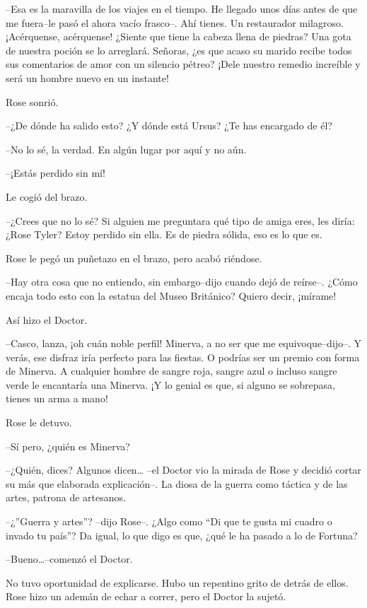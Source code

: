 --Esa es la maravilla de los viajes en el tiempo. He llegado unos días
antes de que me fuera--le pasó el ahora vacío frasco--. Ahí tienes. Un
restaurador milagroso. ¡Acérquense, acérquense! ¿Siente que tiene la
cabeza llena de piedras? Una gota de nuestra poción se lo arreglará.
Señoras, ¿es que acaso su marido recibe todos sus comentarios de amor
con un silencio pétreo? ¡Dele nuestro remedio increíble y será un hombre
nuevo en un instante!

Rose sonrió.

--¿De dónde ha salido esto? ¿Y dónde está Ursus? ¿Te has encargado de
él?

--No lo sé, la verdad. En algún lugar por aquí y no aún.

--¡Estás perdido sin mí!

Le cogió del brazo.

--¿Crees que no lo sé? Si alguien me preguntara qué tipo de amiga eres,
les diría: ¿Rose Tyler? Estoy perdido sin ella. Es de piedra sólida, eso
es lo que es.

Rose le pegó un puñetazo en el brazo, pero acabó riéndose.

--Hay otra cosa que no entiendo, sin embargo--dijo cuando dejó de
reírse--. ¿Cómo encaja todo esto con la estatua del Museo Británico?
Quiero decir, ¡mírame!

Así hizo el Doctor.

--Casco, lanza, ¡oh cuán noble perfil! Minerva, a no ser que me
equivoque--dijo--. Y verás, ese disfraz iría perfecto para las fiestas.
O podrías ser un premio con forma de Minerva. A cualquier hombre de
sangre roja, sangre azul o incluso sangre verde le encantaría una
Minerva. ¡Y lo genial es que, si alguno se sobrepasa, tienes un arma a
mano!

Rose le detuvo.

--Sí pero, ¿quién es Minerva?

--¿Quién, dices? Algunos dicen\ldots{} --el Doctor vio la mirada de Rose
y decidió cortar su más que elaborada explicación--. La diosa de la
guerra como táctica y de las artes, patrona de artesanos.

--¿''Guerra y artes''? --dijo Rose--. ¿Algo como ``Di que te gusta mi
cuadro o invado tu país''? Da igual, lo que digo es que, ¿qué le ha
pasado a lo de Fortuna?

--Bueno\ldots{}--comenzó el Doctor.

No tuvo oportunidad de explicarse. Hubo un repentino grito de detrás de
ellos. Rose hizo un ademán de echar a correr, pero el Doctor la sujetó.

